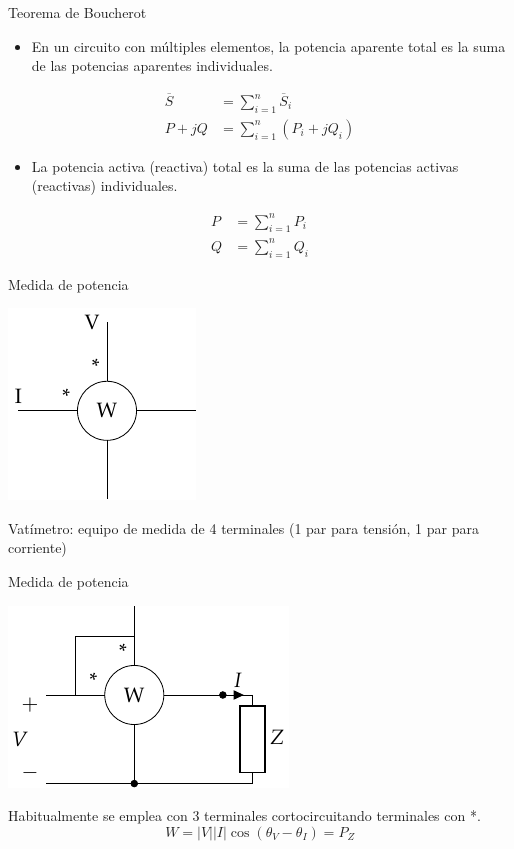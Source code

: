 \documentclass[aspectratio=169, usenames,svgnames,dvipsnames]{beamer}
\begin{document}
\begin{frame}[label={sec:org737054b}]{Teorema de Boucherot}
\begin{itemize}
\item En un circuito con múltiples elementos, la potencia aparente total es la suma de las potencias aparentes individuales.
\end{itemize}
\begin{align*}
  \overline{S} &= \sum_{i = 1}^{n} \overline{S}_i\\
  P + jQ &= \sum^n_{i = 1} (P_i + jQ_i)
\end{align*}

\begin{itemize}
\item La potencia activa (reactiva) total es la suma de las potencias activas (reactivas) individuales.
\end{itemize}

\begin{align*}
P &= \sum_{i = 1}^n P_i\\
Q &= \sum_{i = 1}^n Q_i
\end{align*}
\end{frame}

\begin{frame}[label={sec:org3f5a7e8}]{Medida de potencia}
\begin{center}
\includegraphics[height=0.7\textheight]{../figs/vatimetro.pdf}
\end{center}

\alert{Vatímetro}: equipo de medida de 4 terminales (1 par para tensión, 1 par para corriente)
\end{frame}

\begin{frame}[label={sec:orgc22b005}]{Medida de potencia}
\begin{center}
\includegraphics[height=0.5\textheight]{../figs/vatimetro_Z.pdf}
\end{center}


Habitualmente se emplea con 3 terminales cortocircuitando terminales con *.
\[
  \boxed{W = |V| |I| \cos(\theta_V - \theta_I) = P_Z}
\]
\end{frame}
\end{document}
